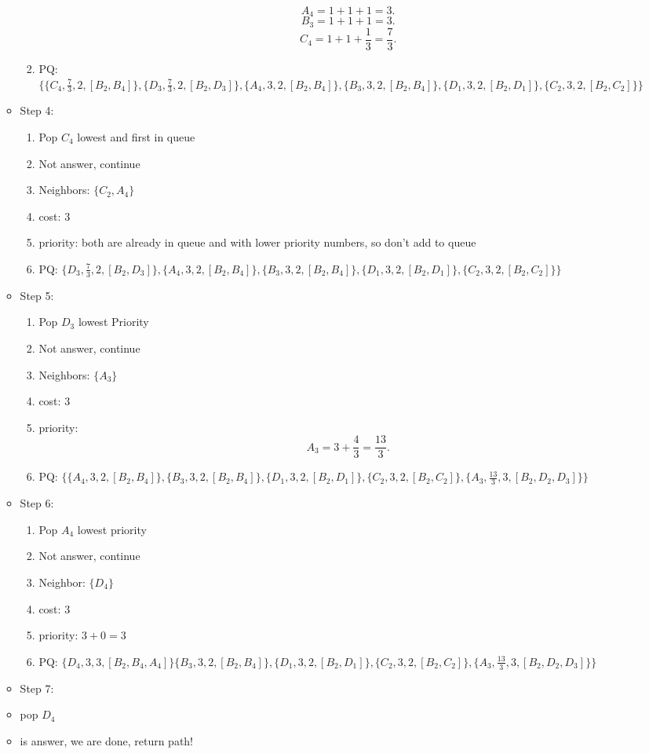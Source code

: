 \documentclass[a4paper]{article}
\begin{document}
\begin{enumerate}
\begin{itemize}
\begin{enumerate}
        \[
        A_4 = 1 + 1 + 1 = 3
        .\] 
         \[
        B_3 = 1 + 1 + 1 = 3
        .\] 
        \[
        C_4 = 1 + 1 + \frac{1}{3} = \frac{7}{3}
        .\] 
      \item PQ: $\{\{C_4, \frac{7}{3},2,[B_2,B_4]\}, \{D_3, \frac{7}{3},2,[B_2,D_3]\}, \{A_4,3,2,[B_2,B_4]\},  \{B_3, 3,2,[B_2,B_4]\},\{D_1, 3,2,[B_2,D_1]\}, \{C_2,3,2,[B_2,C_2]\}\}$
    \end{enumerate}
  \item Step 4:
    \begin{enumerate}
      \item Pop $C_4$ lowest and first in queue
      \item Not answer, continue
      \item Neighbors: $\{C_2, A_4\} $ 
      \item cost: $3$
      \item priority: both are already in queue and with lower priority numbers, so don't add to queue
      \item PQ: $\{D_3, \frac{7}{3},2,[B_2,D_3]\}, \{A_4,3,2,[B_2,B_4]\},  \{B_3, 3,2,[B_2,B_4]\},\{D_1, 3,2,[B_2,D_1]\}, \{C_2,3,2,[B_2,C_2]\}\}$
    \end{enumerate}
  \item Step 5:
    \begin{enumerate}
      \item Pop $D_3$ lowest Priority
      \item Not answer, continue
      \item Neighbors:  $\{A_3\} $ 
      \item cost: $3$
      \item priority:
         \[
           A_3 = 3 + \frac{4}{3} = \frac{13}{3}
        .\] 
      \item PQ:  $\{ \{A_4,3,2,[B_2,B_4]\},  \{B_3, 3,2,[B_2,B_4]\},\{D_1, 3,2,[B_2,D_1]\}, \{C_2,3,2,[B_2,C_2]\}, \{A_3, \frac{13}{3}, 3, [B_2,D_2,D_3]\} \}$
    \end{enumerate}
  \item Step 6:
    \begin{enumerate}
      \item Pop $A_4$ lowest priority
      \item Not answer, continue
      \item Neighbor:  $\{D_4\} $ 
      \item cost: $3$
      \item priority:  $3 + 0 = 3$
    \item PQ:  $ \{D_4,3,3, [B_2,B_4,A_4]\}  \{B_3, 3,2,[B_2,B_4]\},\{D_1, 3,2,[B_2,D_1]\}, \{C_2,3,2,[B_2,C_2]\}, \{A_3, \frac{13}{3}, 3, [B_2,D_2,D_3]\} \}$
    \end{enumerate}
  \item Step 7:
  \item pop $D_4$ 
  \item is answer, we are done, return path!
\end{itemize}
\end{enumerate}
\end{document}
